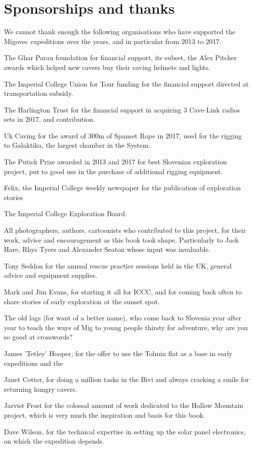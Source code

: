 \chapter{Sponsorships and thanks}
We cannot thank enough the following organisations who have supported the Migovec expeditions over the years, and in particular from 2013 to 2017.
\begin{citemize}
\item The Ghar Parau foundation for financial support, its subset, the Alex Pitcher awards which helped new cavers buy their caving helmets and lights.
\item The Imperial College Union for Tour funding for the financial support directed at transportation subsidy.
\item The Harlington Trust for the financial support in acquiring 3 Cave-Link radios sets in 2017, and contribution.
\item Uk Caving for the award of 300m of Spanset Rope in 2017, used for the rigging to Galaktika, the largest chamber in the System.
\item The Putick Prize awarded in 2013 and 2017 for best Slovenian exploration project, put to good use in the purchase of additional rigging equipment.
\item Felix, the Imperial College weekly newspaper for the publication of exploration stories
\item The Imperial College Exploration Board. 


\item All photographers, authors, cartoonists who contributed to this project, for their work, advice and encouragement as this book took shape. Particularly to Jack Hare, Rhys Tyers and Alexander Seaton whose input was invaluable. 

\item Tony Seddon for the annual rescue practice sessions held in the UK, general advice and equipment supplies.

\item Mark and Jim Evans, for starting it all for ICCC, and for coming back often to share stories of early exploration at the sunset spot.
\item The old lags (for want of a better name), who come back to Slovenia year after year to teach the ways of Mig to young people thirsty for adventure, why are you so good at crosswords?
\item James 'Tetley' Hooper, for the offer to use the Tolmin flat as a base in early expeditions and the 
\item Janet Cotter, for doing a million tasks in the Bivi and always cracking a smile for returning hungry cavers. 
\item Jarvist Frost for the colossal amount of work dedicated to the Hollow Mountain project, which is very much the inspiration and basis for this book. 
\item Dave Wilson, for the technical expertise in setting up the solar panel electronics, on which the expedition depends.


\end{citemize}
